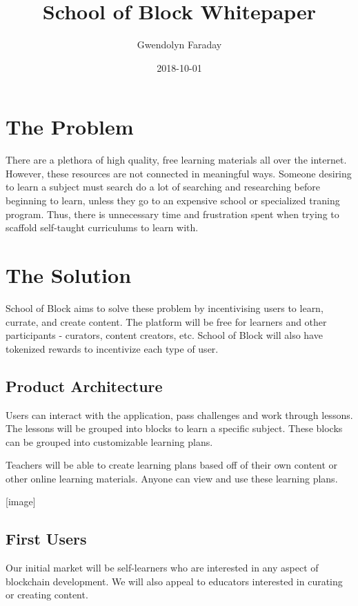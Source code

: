 \documentclass{article}
\title{School of Block Whitepaper}
\date{2018-10-01}
\author{Gwendolyn Faraday}
\begin{document}
  \maketitle
  \newpage

  \section{The Problem}

  There are a plethora of high quality, free learning materials all over the internet. However, these resources are not connected in meaningful ways. Someone desiring to learn a subject must search do a lot of searching and researching before beginning to learn, unless they go to an expensive school or specialized traning program. Thus, there is unnecessary time and frustration spent when trying to scaffold self-taught curriculums to learn with.

  \section{The Solution}

  School of Block aims to solve these problem by incentivising users to learn, currate, and create content. The platform will be free for learners and other participants - curators, content creators, etc. School of Block will also have tokenized rewards to incentivize each type of user.

  \subsection{Product Architecture}

  Users can interact with the application, pass challenges and work through lessons. The lessons will be grouped into blocks to learn a specific subject. These blocks can be grouped into customizable learning plans.
  
  Teachers will be able to create learning plans based off of their own content or other online learning materials. Anyone can view and use these learning plans.
  
  [image]

  \subsection{First Users}

  Our initial market will be self-learners who are interested in any aspect of blockchain development. We will also appeal to educators interested in curating or creating content.
  
\end{document}
